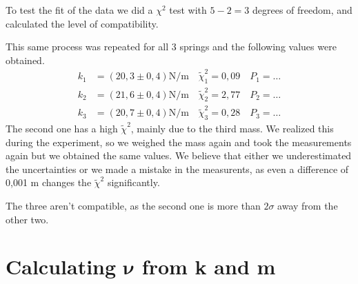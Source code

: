 \documentclass{article}
\begin{document}
To test the fit of the data we did a $\chi^2$ test with $5-2 = 3$ degrees of freedom, and calculated the level of compatibility.

This same process was repeated for all 3 springs and the following values were obtained.
\begin{align}
    k_1 &= (20,3 \pm 0,4) \text{N/m} \quad \tilde \chi_1^2 = 0,09 \quad P_1 = \dots \\
    k_2 &= (21,6 \pm 0,4) \text{N/m} \quad \tilde \chi_2^2 = 2,77 \quad P_2 = \dots \\
    k_3 &= (20,7 \pm 0,4) \text{N/m} \quad \tilde \chi_3^2 = 0,28 \quad P_3 = \dots 
\end{align}
The second one has a high $\tilde \chi^2$, mainly due to the third mass. We realized this during the experiment, so we weighed the mass again and took the measurements again but we obtained the same values. We believe that either we underestimated the uncertainties or we made a mistake in the measurents, as even a difference of 0,001 m changes the $\tilde \chi^2$ significantly.

The three aren't compatible, as the second one is more than $2 \sigma$ away from the other two. 

\section{Calculating $\bm \nu$ from k and m} \label{sec:nukm}
\end{document}
